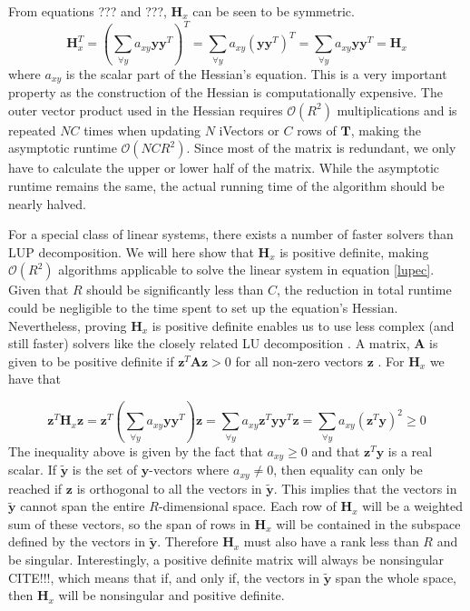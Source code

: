 From equations ??? and ???, $\mathbf{H}_x$ can be seen to be symmetric.
\begin{equation}\label{symproof}
\mathbf{H}_x^T = \left(\sum_{\forall y}a_{xy}\mathbf{y}\mathbf{y}^T\right)^T = 
\sum_{\forall y}a_{xy}\left(\mathbf{y}\mathbf{y}^T\right)^T =
 \sum_{\forall y}a_{xy}\mathbf{y}\mathbf{y}^T = \mathbf{H}_x
\end{equation}
where $a_{xy}$ is the scalar part of the Hessian's equation. This is a very important property as the construction of the Hessian is computationally expensive. The outer vector product used in the Hessian requires $\mathcal{O}(R^2)$ multiplications and is repeated $NC$ times when updating $N$ iVectors or $C$ rows of $\mathbf{T}$, making the asymptotic runtime $\mathcal{O}(NCR^2)$.  Since most of the matrix is redundant, we only have to calculate the upper or lower half of the matrix. While the asymptotic runtime remains the same, the actual running time of the algorithm should be nearly halved.

For a special class of linear systems, there exists a number of faster solvers than LUP decomposition. We will here show that $\mathbf{H}_x$ is positive definite, making $\mathcal{O}(R^2)$ algorithms applicable \cite{tewfik1994fast} to solve the linear system in equation \ref{lupec}. Given that $R$ should be significantly less than $C$, the reduction in total runtime could be negligible to the time spent to set up the equation's Hessian. Nevertheless, proving $\mathbf{H}_x$ is positive definite enables us to use less complex (and still faster) solvers like the closely related LU decomposition \cite[p. 749]{cormen}. A matrix, $\mathbf{A}$ is given to be positive definite if $\mathbf{z}^T\mathbf{Az} > 0$ for all non-zero vectors $\mathbf{z}$ \cite[p. 246]{matte3}. For $\mathbf{H}_x$ we have that

\begin{equation}
\mathbf{z}^T\mathbf{H}_x\mathbf{z} = \mathbf{z}^T\left(\sum_{\forall y}a_{xy}\mathbf{y}\mathbf{y}^T\right)\mathbf{z} 
= \sum_{\forall y}a_{xy}\mathbf{z}^T\mathbf{y}\mathbf{y}^T\mathbf{z} 
= \sum_{\forall y}a_{xy}\left(\mathbf{z}^T\mathbf{y}\right)^2 \geq 0 
\end{equation}
The inequality above is given by the fact that $a_{xy} \geq 0$ and that $\mathbf{z}^T\mathbf{y}$ is a real scalar. If $\mathbf{\tilde{y}}$ is the set of $\mathbf{y}$-vectors where $a_{xy} \neq 0$, then equality can only be reached if $\mathbf{z}$ is orthogonal to all the vectors in $\mathbf{\tilde{y}}$. This implies that the vectors in $\mathbf{\tilde{y}}$ cannot span the entire $R$-dimensional space. Each row of $\mathbf{H}_x$ will be a weighted sum of these vectors, so the span of rows in $\mathbf{H}_x$ will be contained in the subspace defined by the vectors in $\mathbf{\tilde{y}}$. Therefore $\mathbf{H}_x$ must also have a rank less than $R$ and be singular. Interestingly, a positive definite matrix will always be nonsingular CITE!!!, which means that if, and only if, the vectors in $\mathbf{\tilde{y}}$ span the whole space, then $\mathbf{H}_x$ will be nonsingular and positive definite. 

